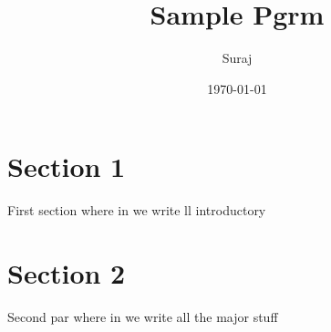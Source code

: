 \documentclass{article}
\title{Sample Pgrm}
\author{Suraj}
\date{\today}
\begin{document}
    \maketitle
    \thispagestyle{fancy}
    
    \section{Section 1}
        First section where in we write ll introductory
    \section{Section 2}
        Second par where in we write all the major stuff
\end{document}
